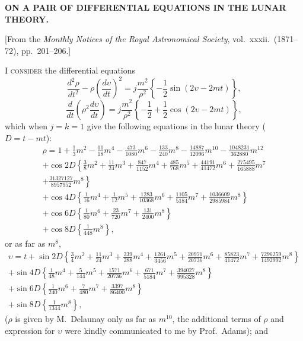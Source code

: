 \documentclass[11pt,a4paper]{article}
\theoremstyle{plain}
\theoremstyle{definition}
\theoremstyle{remark}
\begin{document}
\begin{center}
\textbf{ON A PAIR OF DIFFERENTIAL EQUATIONS IN THE LUNAR THEORY.}
\end{center}

[From the \textit{Monthly Notices of the Royal Astronomical Society}, vol.\ xxxii.\ (1871--72), pp.\ 201--206.]

\bigskip

\textsc{I consider} the differential equations
\[
\frac{d^{2}\rho}{dt^{2}}-\rho\left(\frac{d\upsilon}{dt}\right)^{2}=j\frac{m^{2}}{\rho^{2}}\left\{-\frac12 \sin(2\upsilon-2mt)\right\},
\]
\[
\frac{d}{dt}\left(\rho^{2}\frac{d\upsilon}{dt}\right)=j\frac{m^{2}}{\rho^{2}}\left\{-\frac12 + \frac12 \cos(2\upsilon-2mt)\right\},
\]
which when $j=k=1$ give the following equations in the lunar theory ($D=t-mt$):
\begin{multline*}
\rho = 1 + \tfrac13 m^{2} - \tfrac{11}{18}m^{4} - \tfrac{473}{1080}m^{6} - \tfrac{133}{240}m^{8} - \tfrac{14887}{12096}m^{10} - \tfrac{1048231}{362880}m^{12}\\
+ \cos 2D\left\{\tfrac38 m^{2} + \tfrac{11}{24}m^{3} + \tfrac{847}{1152}m^{4} + \tfrac{485}{768}m^{5} + \tfrac{44191}{41472}m^{6} + \tfrac{275495}{165888}m^{7}\right.\\
\left. + \tfrac{31327127}{8957952}m^{8}\right\}\\
+ \cos 4D\left\{\tfrac{1}{16}m^{4} + \tfrac{1}{12}m^{5} + \tfrac{1283}{10368}m^{6} + \tfrac{1105}{5184}m^{7} + \tfrac{1036609}{2985984}m^{8}\right\}\\
+ \cos 6D\left\{\tfrac{1}{80}m^{6} + \tfrac{23}{720}m^{7} + \tfrac{131}{2400}m^{8}\right\}\\
+ \cos 8D\left\{\tfrac{1}{448}m^{8}\right\},
\end{multline*}
or as far as $m^{8}$,
\begin{multline*}
\upsilon = t + \sin 2D\left\{\tfrac34 m^{2} + \tfrac{11}{24}m^{3} + \tfrac{239}{288}m^{4} + \tfrac{1261}{3456}m^{5} + \tfrac{20971}{20736}m^{6} + \tfrac{85823}{41472}m^{7} + \tfrac{7296259}{1492992}m^{8}\right\}\\
+ \sin 4D\left\{\tfrac{1}{48}m^{4} + \tfrac{5}{144}m^{5} + \tfrac{1571}{20736}m^{6} + \tfrac{671}{5184}m^{7} + \tfrac{394027}{995328}m^{8}\right\}\\
+ \sin 6D\left\{\tfrac{1}{240}m^{6} + \tfrac{7}{480}m^{7} + \tfrac{3397}{86400}m^{8}\right\}\\
+ \sin 8D\left\{\tfrac{1}{1344}m^{8}\right\},
\end{multline*}
($\rho$ is given by M.\ Delaunay only as far as $m^{10}$, the additional terms of $\rho$ and expression for $\upsilon$ were kindly communicated to me by Prof.\ Adams); and
\end{document}
